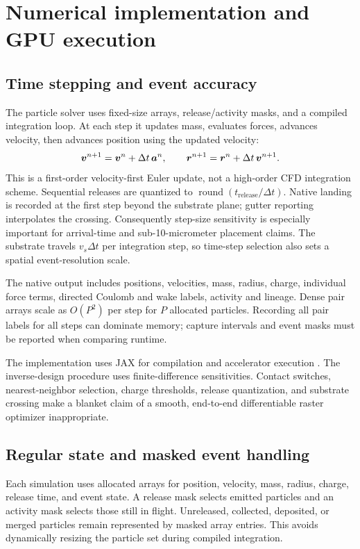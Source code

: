 \section{Numerical implementation and GPU execution}
\subsection{Time stepping and event accuracy}

The particle solver uses fixed-size arrays, release/activity masks, and a compiled integration loop. At each step it updates mass, evaluates forces, advances velocity, then advances position using the updated velocity:
\begin{equation}
 \boldsymbol{v}^{n+1}=\boldsymbol{v}^n+\Delta t\,\boldsymbol{a}^n,\qquad
 \boldsymbol{r}^{n+1}=\boldsymbol{r}^n+\Delta t\,\boldsymbol{v}^{n+1}.
\end{equation}
This is a first-order velocity-first Euler update, not a high-order CFD integration scheme. Sequential releases are quantized to $\operatorname{round}(t_{\mathrm{release}}/\Delta t)$. Native landing is recorded at the first step beyond the substrate plane; gutter reporting interpolates the crossing. Consequently step-size sensitivity is especially important for arrival-time and sub-10-micrometer placement claims. The substrate travels $v_s\Delta t$ per integration step, so time-step selection also sets a spatial event-resolution scale.

The native output includes positions, velocities, mass, radius, charge, individual force terms, directed Coulomb and wake labels, activity and lineage. Dense pair arrays scale as $O(P^2)$ per step for $P$ allocated particles. Recording all pair labels for all steps can dominate memory; capture intervals and event masks must be reported when comparing runtime.

The implementation uses JAX for compilation and accelerator execution \citep{jax,jaxjit}. The inverse-design procedure uses finite-difference sensitivities. Contact switches, nearest-neighbor selection, charge thresholds, release quantization, and substrate crossing make a blanket claim of a smooth, end-to-end differentiable raster optimizer inappropriate.


\subsection{Regular state and masked event handling}
Each simulation uses allocated arrays for position, velocity, mass, radius, charge, release time, and event state. A release mask selects emitted particles and an activity mask selects those still in flight. Unreleased, collected, deposited, or merged particles remain represented by masked array entries. This avoids dynamically resizing the particle set during compiled integration.

